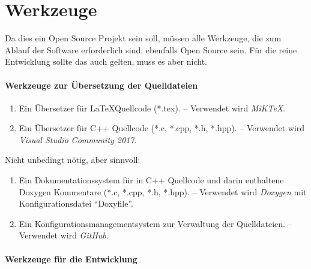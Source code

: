 \section{Werkzeuge}%
\label{sec-Werkzeuge}

Da dies ein Open Source Projekt sein soll, müssen alle Werkzeuge, die zum Ablauf der Software erforderlich sind, ebenfalls Open Source sein.
Für die reine Entwicklung sollte das auch gelten, muss es aber nicht.

\paragraph{Werkzeuge zur Übersetzung der Quelldateien}%

\begin{enumerate}

	\item\label{Werkzeug:LaTeX}
	Ein Übersetzer für \LaTeX Quellcode (*.tex).
	-- Verwendet wird \emph{MiK\TeX}.

	\item\label{Werkzeug:Cpp}
	Ein Übersetzer für C++ Quellcode (*.c, *.cpp, *.h, *.hpp).
	-- Verwendet wird \emph{Visual Studio Community 2017}.

	\setcounter{Enumi}{\value{enumi}}%
\end{enumerate}
%
Nicht unbedingt nötig, aber sinnvoll:
\begin{enumerate}
	\setcounter{enumi}{\value{Enumi}}%

	\item\label{Werkzeug:Dokumentation}
	Ein Dokumentationssystem für in C++ Quellcode und darin enthaltene Doxygen Kommentare (*.c, *.cpp, *.h, *.hpp).
	-- Verwendet wird \emph{Doxygen} mit Konfigurationsdatei \enquote{Doxyfile}.

	\item\label{Werkzeug:Konfigurationsmanagement}
	Ein Konfigurationsmanagementsystem zur Verwaltung der Quelldateien.
	-- Verwendet wird \emph{GitHub}.

	\setcounter{Enumi}{\value{enumi}}%
\end{enumerate}

\paragraph{Werkzeuge für die Entwicklung}%

